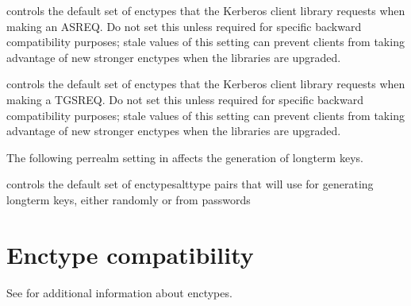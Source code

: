\documentclass[letterpaper,10pt,english]{sphinxmanual}
\begin{document}
\begin{description}
\sphinxAtStartPar
controls the default set of enctypes that the Kerberos client
library requests when making an AS\sphinxhyphen{}REQ.  Do not set this unless
required for specific backward compatibility purposes; stale
values of this setting can prevent clients from taking advantage
of new stronger enctypes when the libraries are upgraded.

\sphinxAtStartPar
controls the default set of enctypes that the Kerberos client
library requests when making a TGS\sphinxhyphen{}REQ.  Do not set this unless
required for specific backward compatibility purposes; stale
values of this setting can prevent clients from taking advantage
of new stronger enctypes when the libraries are upgraded.

\end{description}

\sphinxAtStartPar
The following per\sphinxhyphen{}realm setting in {\hyperref[\detokenize{admin/conf_files/kdc_conf:kdc-conf-5}]{}} affects the
generation of long\sphinxhyphen{}term keys.
\begin{description}
\sphinxAtStartPar
controls the default set of enctype\sphinxhyphen{}salttype pairs that {\hyperref[\detokenize{admin/admin_commands/kadmind:kadmind-8}]{}}
will use for generating long\sphinxhyphen{}term keys, either randomly or from
passwords

\end{description}


\section{Enctype compatibility}
\label{\detokenize{admin/enctypes:enctype-compatibility}}
\sphinxAtStartPar
See {\hyperref[\detokenize{admin/conf_files/kdc_conf:encryption-types}]{}} for additional information about enctypes.
\end{document}
